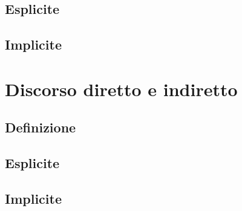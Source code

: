 \documentclass[a4paper,twoside,11pt,chapterprefix=false,bibliography=totocnumbered,listof=flat]{scrbook}
\begin{document}
\hypertarget{esplicite-6}{%
\section{Esplicite}\label{esplicite-6}}

\hypertarget{implicite-6}{%
\section{Implicite}\label{implicite-6}}

\hypertarget{discorso-diretto-e-indiretto}{%
\chapter{Discorso diretto e
indiretto}\label{discorso-diretto-e-indiretto}}

\hypertarget{definizione-5}{%
\section{Definizione}\label{definizione-5}}

\hypertarget{esplicite-7}{%
\section{Esplicite}\label{esplicite-7}}

\hypertarget{implicite-7}{%
\section{Implicite}\label{implicite-7}}


\end{document}
